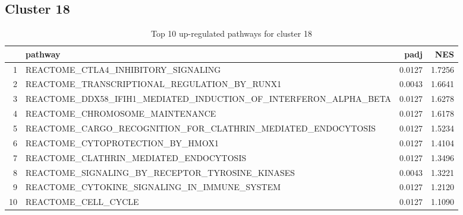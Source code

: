 \documentclass{article}
\begin{document}
\subsection{Cluster 18 }
\begin{table}[H]
\centering
\begin{tabularx}{\textwidth}{rlrr}
  \hline
 & pathway & padj & NES \\ 
  \hline
1 & REACTOME\_CTLA4\_INHIBITORY\_SIGNALING & 0.0127 & 1.7256 \\ 
  2 & REACTOME\_TRANSCRIPTIONAL\_REGULATION\_BY\_RUNX1 & 0.0043 & 1.6641 \\ 
  3 & REACTOME\_DDX58\_IFIH1\_MEDIATED\_INDUCTION\_OF\_INTERFERON\_ALPHA\_BETA & 0.0127 & 1.6278 \\ 
  4 & REACTOME\_CHROMOSOME\_MAINTENANCE & 0.0127 & 1.6178 \\ 
  5 & REACTOME\_CARGO\_RECOGNITION\_FOR\_CLATHRIN\_MEDIATED\_ENDOCYTOSIS & 0.0127 & 1.5234 \\ 
  6 & REACTOME\_CYTOPROTECTION\_BY\_HMOX1 & 0.0127 & 1.4104 \\ 
  7 & REACTOME\_CLATHRIN\_MEDIATED\_ENDOCYTOSIS & 0.0127 & 1.3496 \\ 
  8 & REACTOME\_SIGNALING\_BY\_RECEPTOR\_TYROSINE\_KINASES & 0.0043 & 1.3221 \\ 
  9 & REACTOME\_CYTOKINE\_SIGNALING\_IN\_IMMUNE\_SYSTEM & 0.0127 & 1.2120 \\ 
  10 & REACTOME\_CELL\_CYCLE & 0.0127 & 1.1090 \\ 
   \hline
\end{tabularx}
\caption{Top 10 up-regulated pathways for cluster 18} 
\label{tab:q3_2_18}
\end{table}
\end{document}
